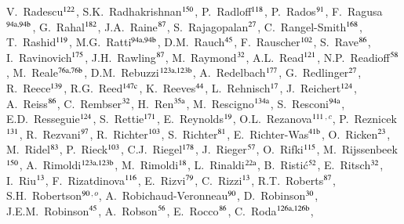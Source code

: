 \begin{flushleft}
V.~Radescu$^\textrm{\scriptsize 122}$,
S.K.~Radhakrishnan$^\textrm{\scriptsize 150}$,
P.~Radloff$^\textrm{\scriptsize 118}$,
P.~Rados$^\textrm{\scriptsize 91}$,
F.~Ragusa$^\textrm{\scriptsize 94a,94b}$,
G.~Rahal$^\textrm{\scriptsize 182}$,
J.A.~Raine$^\textrm{\scriptsize 87}$,
S.~Rajagopalan$^\textrm{\scriptsize 27}$,
C.~Rangel-Smith$^\textrm{\scriptsize 168}$,
T.~Rashid$^\textrm{\scriptsize 119}$,
M.G.~Ratti$^\textrm{\scriptsize 94a,94b}$,
D.M.~Rauch$^\textrm{\scriptsize 45}$,
F.~Rauscher$^\textrm{\scriptsize 102}$,
S.~Rave$^\textrm{\scriptsize 86}$,
I.~Ravinovich$^\textrm{\scriptsize 175}$,
J.H.~Rawling$^\textrm{\scriptsize 87}$,
M.~Raymond$^\textrm{\scriptsize 32}$,
A.L.~Read$^\textrm{\scriptsize 121}$,
N.P.~Readioff$^\textrm{\scriptsize 58}$,
M.~Reale$^\textrm{\scriptsize 76a,76b}$,
D.M.~Rebuzzi$^\textrm{\scriptsize 123a,123b}$,
A.~Redelbach$^\textrm{\scriptsize 177}$,
G.~Redlinger$^\textrm{\scriptsize 27}$,
R.~Reece$^\textrm{\scriptsize 139}$,
R.G.~Reed$^\textrm{\scriptsize 147c}$,
K.~Reeves$^\textrm{\scriptsize 44}$,
L.~Rehnisch$^\textrm{\scriptsize 17}$,
J.~Reichert$^\textrm{\scriptsize 124}$,
A.~Reiss$^\textrm{\scriptsize 86}$,
C.~Rembser$^\textrm{\scriptsize 32}$,
H.~Ren$^\textrm{\scriptsize 35a}$,
M.~Rescigno$^\textrm{\scriptsize 134a}$,
S.~Resconi$^\textrm{\scriptsize 94a}$,
E.D.~Resseguie$^\textrm{\scriptsize 124}$,
S.~Rettie$^\textrm{\scriptsize 171}$,
E.~Reynolds$^\textrm{\scriptsize 19}$,
O.L.~Rezanova$^\textrm{\scriptsize 111}$$^{,c}$,
P.~Reznicek$^\textrm{\scriptsize 131}$,
R.~Rezvani$^\textrm{\scriptsize 97}$,
R.~Richter$^\textrm{\scriptsize 103}$,
S.~Richter$^\textrm{\scriptsize 81}$,
E.~Richter-Was$^\textrm{\scriptsize 41b}$,
O.~Ricken$^\textrm{\scriptsize 23}$,
M.~Ridel$^\textrm{\scriptsize 83}$,
P.~Rieck$^\textrm{\scriptsize 103}$,
C.J.~Riegel$^\textrm{\scriptsize 178}$,
J.~Rieger$^\textrm{\scriptsize 57}$,
O.~Rifki$^\textrm{\scriptsize 115}$,
M.~Rijssenbeek$^\textrm{\scriptsize 150}$,
A.~Rimoldi$^\textrm{\scriptsize 123a,123b}$,
M.~Rimoldi$^\textrm{\scriptsize 18}$,
L.~Rinaldi$^\textrm{\scriptsize 22a}$,
B.~Risti\'{c}$^\textrm{\scriptsize 52}$,
E.~Ritsch$^\textrm{\scriptsize 32}$,
I.~Riu$^\textrm{\scriptsize 13}$,
F.~Rizatdinova$^\textrm{\scriptsize 116}$,
E.~Rizvi$^\textrm{\scriptsize 79}$,
C.~Rizzi$^\textrm{\scriptsize 13}$,
R.T.~Roberts$^\textrm{\scriptsize 87}$,
S.H.~Robertson$^\textrm{\scriptsize 90}$$^{,o}$,
A.~Robichaud-Veronneau$^\textrm{\scriptsize 90}$,
D.~Robinson$^\textrm{\scriptsize 30}$,
J.E.M.~Robinson$^\textrm{\scriptsize 45}$,
A.~Robson$^\textrm{\scriptsize 56}$,
E.~Rocco$^\textrm{\scriptsize 86}$,
C.~Roda$^\textrm{\scriptsize 126a,126b}$,

\end{flushleft}
